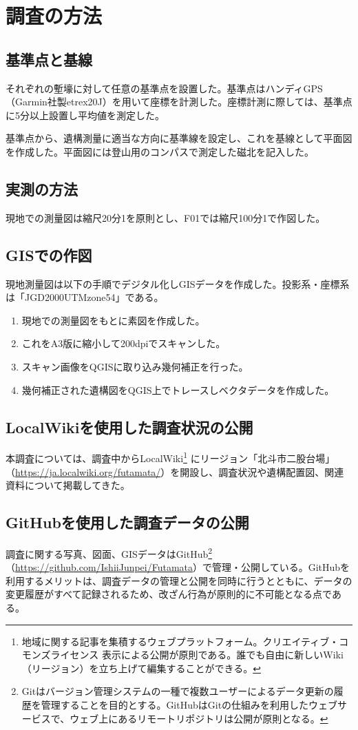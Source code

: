 \documentclass[14Q]{jsarticle}
\begin{document}
\section{調査の方法}
\subsection{基準点と基線}
それぞれの塹壕に対して任意の基準点を設置した。基準点はハンディGPS（Garmin社製etrex20J）を用いて座標を計測した。座標計測に際しては、基準点に5分以上設置し平均値を測定した。

基準点から、遺構測量に適当な方向に基準線を設定し、これを基線として平面図を作成した。平面図には登山用のコンパスで測定した磁北を記入した。

\subsection{実測の方法}
現地での測量図は縮尺20分1を原則とし、F01では縮尺100分1で作図した。

\subsection{GISでの作図}
現地測量図は以下の手順でデジタル化しGISデータを作成した。投影系・座標系は「JGD2000UTMzone54」である。
\begin{enumerate}
\item 現地での測量図をもとに素図を作成した。
\item これをA3版に縮小して200dpiでスキャンした。
\item スキャン画像をQGISに取り込み幾何補正を行った。
\item 幾何補正された遺構図をQGIS上でトレースしベクタデータを作成した。
\end{enumerate}

\subsection{LocalWikiを使用した調査状況の公開}
本調査については、調査中からLocalWiki\footnote{
地域に関する記事を集積するウェブプラットフォーム。クリエイティブ・コモンズライセンス 表示による公開が原則である。誰でも自由に新しいWiki（リージョン）を立ち上げて編集することができる。
}
にリージョン「北斗市二股台場」（\url{https://ja.localwiki.org/futamata/}）を開設し、調査状況や遺構配置図、関連資料について掲載してきた。

\subsection{GitHubを使用した調査データの公開}
調査に関する写真、図面、GISデータはGitHub\footnote{
Gitはバージョン管理システムの一種で複数ユーザーによるデータ更新の履歴を管理することを目的とする。GitHubはGitの仕組みを利用したウェブサービスで、ウェブ上にあるリモートリポジトリは公開が原則となる。
}
（\url{https://github.com/IshiiJunpei/Futamata}）で管理・公開している。GitHubを利用するメリットは、調査データの管理と公開を同時に行うとともに、データの変更履歴がすべて記録されるため、改ざん行為が原則的に不可能となる点である。
\end{document}
